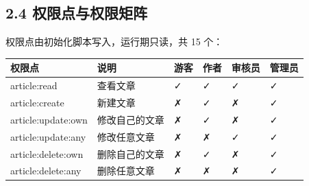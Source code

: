 \documentclass[zihao=-4,UTF8,openany]{ctexart}
\renewcommand{\_}{\textunderscore\allowbreak}
\begin{document}
\subsection*{\texorpdfstring{\textbf{2.4 权限点与权限矩阵}}{2.4 权限点与权限矩阵}}\label{ux6743ux9650ux70b9ux4e0eux6743ux9650ux77e9ux9635}

权限点由初始化脚本写入，运行期只读，共 15 个：

\begin{longtable}[]{@{}
  >{\raggedright\arraybackslash}p{}
  >{\raggedright\arraybackslash}p{}
  >{\raggedright\arraybackslash}p{}
  >{\raggedright\arraybackslash}p{}
  >{\raggedright\arraybackslash}p{}
  >{\raggedright\arraybackslash}p{}@{}}
\toprule\noalign{}
\begin{minipage}[b]{\linewidth}\raggedright
\textbf{权限点}
\end{minipage} & \begin{minipage}[b]{\linewidth}\raggedright
\textbf{说明}
\end{minipage} & \begin{minipage}[b]{\linewidth}\raggedright
\textbf{游客}
\end{minipage} & \begin{minipage}[b]{\linewidth}\raggedright
\textbf{作者}
\end{minipage} & \begin{minipage}[b]{\linewidth}\raggedright
\textbf{审核员}
\end{minipage} & \begin{minipage}[b]{\linewidth}\raggedright
\textbf{管理员}
\end{minipage} \\
\midrule\noalign{}
\endhead
\bottomrule\noalign{}
\endlastfoot
article:read & 查看文章 & ✓ & ✓ & ✓ & ✓ \\
article:create & 新建文章 & ✗ & ✓ & ✗ & ✓ \\
article:update:own & 修改自己的文章 & ✗ & ✓ & ✗ & ✓ \\
article:update:any & 修改任意文章 & ✗ & ✗ & ✓ & ✓ \\
article:delete:own & 删除自己的文章 & ✗ & ✓ & ✗ & ✓ \\
article:delete:any & 删除任意文章 & ✗ & ✗ & ✗ & ✓ \\

\end{longtable}
\end{document}
